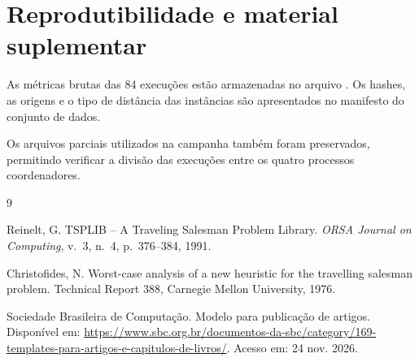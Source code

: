 \documentclass[12pt]{article}
\begin{document}
\section*{Reprodutibilidade e material suplementar}

As métricas brutas das 84 execuções estão armazenadas no arquivo . Os hashes, as origens e o tipo de distância das instâncias são apresentados no manifesto do conjunto de dados.

Os arquivos parciais utilizados na campanha também foram preservados, permitindo verificar a divisão das execuções entre os quatro processos coordenadores.

\begin{thebibliography}{9}

Reinelt, G. TSPLIB -- A Traveling Salesman Problem Library. \emph{ORSA Journal on Computing}, v.~3, n.~4, p.~376--384, 1991.

Christofides, N. Worst-case analysis of a new heuristic for the travelling salesman problem. Technical Report 388, Carnegie Mellon University, 1976.

Sociedade Brasileira de Computação. Modelo para publicação de artigos. Disponível em: \url{https://www.sbc.org.br/documentos-da-sbc/category/169-templates-para-artigos-e-capitulos-de-livros/}. Acesso em: 24 nov. 2026.

\end{thebibliography}
\end{document}
